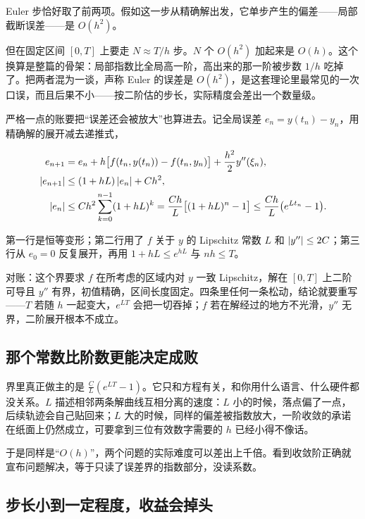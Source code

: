 Euler 步恰好取了前两项。假如这一步从精确解出发，它单步产生的偏差——局部截断误差——是 \(O(h^2)\)。

但在固定区间 \([0,T]\) 上要走 \(N\approx T/h\) 步。\(N\) 个 \(O(h^2)\) 加起来是 \(O(h)\)。这个换算是整篇的骨架：局部指数比全局高一阶，高出来的那一阶被步数 \(1/h\) 吃掉了。把两者混为一谈，声称 Euler 的误差是 \(O(h^2)\)，是这套理论里最常见的一次口误，而且后果不小——按二阶估的步长，实际精度会差出一个数量级。

严格一点的账要把``误差还会被放大''也算进去。记全局误差 \(e_n=y(t_n)-y_n\)，用精确解的展开减去递推式，

\[
\begin{aligned}
e_{n+1}&=e_n+h\bigl[f(t_n,y(t_n))-f(t_n,y_n)\bigr]+\frac{h^2}{2}y''(\xi_n),\\
\left|e_{n+1}\right|&\le(1+hL)\left|e_n\right|+Ch^2,\\
\left|e_n\right|&\le Ch^2\sum_{k=0}^{n-1}(1+hL)^k=\frac{Ch}{L}\bigl[(1+hL)^n-1\bigr]\le\frac{Ch}{L}\bigl(e^{Lt_n}-1\bigr).
\end{aligned}
\]

第一行是恒等变形；第二行用了 \(f\) 关于 \(y\) 的 Lipschitz 常数 \(L\) 和 \(\left|y''\right|\le 2C\)；第三行从 \(e_0=0\) 反复展开，再用 \(1+hL\le e^{hL}\) 与 \(nh\le T\)。

对账：这个界要求 \(f\) 在所考虑的区域内对 \(y\) 一致 Lipschitz，解在 \([0,T]\) 上二阶可导且 \(y''\) 有界，初值精确，区间长度固定。四条里任何一条松动，结论就要重写——\(T\) 若随 \(h\) 一起变大，\(e^{LT}\) 会把一切吞掉；\(f\) 若在解经过的地方不光滑，\(y''\) 无界，二阶展开根本不成立。

\subsection{那个常数比阶数更能决定成败}

界里真正做主的是 \(\frac{C}{L}(e^{LT}-1)\)。它只和方程有关，和你用什么语言、什么硬件都没关系。\(L\) 描述相邻两条解曲线互相分离的速度：\(L\) 小的时候，落点偏了一点，后续轨迹会自己贴回来；\(L\) 大的时候，同样的偏差被指数放大，一阶收敛的承诺在纸面上仍然成立，可要拿到三位有效数字需要的 \(h\) 已经小得不像话。

于是同样是``\(O(h)\)''，两个问题的实际难度可以差出上千倍。看到收敛阶正确就宣布问题解决，等于只读了误差界的指数部分，没读系数。

\subsection{步长小到一定程度，收益会掉头}

